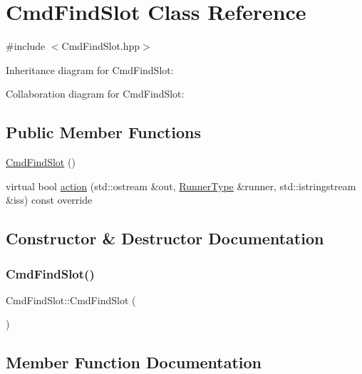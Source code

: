 \hypertarget{classCmdFindSlot}{}\section{Cmd\+Find\+Slot Class Reference}
\label{classCmdFindSlot}


{\ttfamily \#include $<$Cmd\+Find\+Slot.\+hpp$>$}



Inheritance diagram for Cmd\+Find\+Slot\+:


Collaboration diagram for Cmd\+Find\+Slot\+:
\subsection*{Public Member Functions}
\begin{DoxyCompactItemize}
\item 
\hyperlink{classCmdFindSlot_af8c13df1c27a1bf09c19fbef05ef3a2f}{Cmd\+Find\+Slot} ()
\item 
virtual bool \hyperlink{classCmdFindSlot_a01d81fa82fa98c28d353bf7ea28a2afe}{action} (std\+::ostream \&out, \hyperlink{Command_8hpp_ad45c3de597c2023a8be0399d914161f4}{Runner\+Type} \&runner, std\+::istringstream \&iss) const override
\end{DoxyCompactItemize}


\subsection{Constructor \& Destructor Documentation}
\mbox{\label{classCmdFindSlot_af8c13df1c27a1bf09c19fbef05ef3a2f}} 
\subsubsection{\texorpdfstring{Cmd\+Find\+Slot()}{CmdFindSlot()}}
{\footnotesize\ttfamily Cmd\+Find\+Slot\+::\+Cmd\+Find\+Slot (\begin{DoxyParamCaption}{ }\end{DoxyParamCaption})}



\subsection{Member Function Documentation}
\mbox{\label{classCmdFindSlot_a01d81fa82fa98c28d353bf7ea28a2afe}} 
